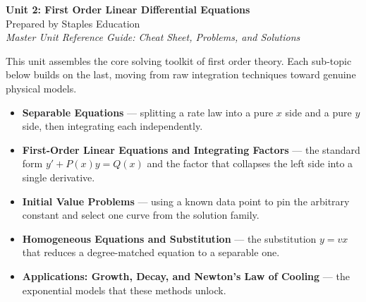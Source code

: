 




\begin{center}
    {\LARGE \bfseries Unit 2: First Order Linear Differential Equations}\\[6pt]
    {\large Prepared by Staples Education}\\[4pt]
    {\itshape Master Unit Reference Guide: Cheat Sheet, Problems, and Solutions}
\end{center}

\vspace{0.4em}

\tableofcontents

\vspace{0.4em}

\begin{topicsbox}
This unit assembles the core solving toolkit of first order theory. Each
sub-topic below builds on the last, moving from raw integration techniques
toward genuine physical models.
\begin{itemize}[leftmargin=1.4em, itemsep=3pt]
    \item \textbf{Separable Equations} --- splitting a rate law into a pure
          $x$ side and a pure $y$ side, then integrating each independently.
    \item \textbf{First-Order Linear Equations and Integrating Factors} ---
          the standard form $y' + P(x)y = Q(x)$ and the factor that collapses
          the left side into a single derivative.
    \item \textbf{Initial Value Problems} --- using a known data point to pin
          the arbitrary constant and select one curve from the solution family.
    \item \textbf{Homogeneous Equations and Substitution} --- the
          substitution $y = vx$ that reduces a degree-matched equation to a
          separable one.
    \item \textbf{Applications: Growth, Decay, and Newton's Law of Cooling}
          --- the exponential models that these methods unlock.
\end{itemize}
\end{topicsbox}

